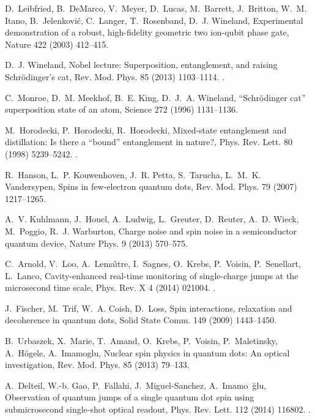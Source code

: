 \documentclass[3p,sort&compress]{elsarticle}
\begin{document}
\begin{thebibliography}{100}
D.~Leibfried, B.~DeMarco, V.~Meyer, D.~Lucas, M.~Barrett, J.~Britton, W.~M.
  Itano, B.~Jelenkovi{\'c}, C.~Langer, T.~Rosenband, D.~J. Wineland,
  Experimental demonstration of a robust, high-fidelity geometric two ion-qubit
  phase gate, Nature 422 (2003) 412--415.

D.~J. Wineland, Nobel lecture: Superposition, entanglement, and raising
  {S}chr{\"o}dinger's cat, Rev. Mod. Phys. 85 (2013) 1103--1114.
\newblock \href {http://dx.doi.org/10.1103/RevModPhys.85.1103}
  {}.

C.~Monroe, D.~M. Meekhof, B.~E. King, D.~J.~A. Wineland, {``}{S}chr{\"o}dinger
  cat{''} superposition state of an atom, Science 272 (1996) 1131--1136.

M.~Horodecki, P.~Horodecki, R.~Horodecki, Mixed-state entanglement and
  distillation: Is there a ``bound'' entanglement in nature?, Phys. Rev. Lett.
  80 (1998) 5239--5242.
\newblock \href {http://dx.doi.org/10.1103/PhysRevLett.80.5239}
  {}.

R.~Hanson, L.~P. Kouwenhoven, J.~R. Petta, S.~Tarucha, L.~M.~K. Vandersypen,
  Spins in few-electron quantum dots, Rev. Mod. Phys. 79 (2007) 1217--1265.

A.~V. Kuhlmann, J.~Houel, A.~Ludwig, L.~Greuter, D.~Reuter, A.~D. Wieck,
  M.~Poggio, R.~J. Warburton, Charge noise and spin noise in a semiconductor
  quantum device, Nature Phys. 9 (2013) 570--575.

C.~Arnold, V.~Loo, A.~Lema\^{\i}tre, I.~Sagnes, O.~Krebs, P.~Voisin,
  P.~Senellart, L.~Lanco, Cavity-enhanced real-time monitoring of single-charge
  jumps at the microsecond time scale, Phys. Rev. X 4 (2014) 021004.
\newblock \href {http://dx.doi.org/10.1103/PhysRevX.4.021004}
  {}.

J.~Fischer, M.~Trif, W.~A. Coish, D.~Loss, Spin interactions, relaxation and
  decoherence in quantum dots, Solid State Comm. 149 (2009) 1443--1450.

B.~Urbaszek, X.~Marie, T.~Amand, O.~Krebs, P.~Voisin, P.~Maletinsky,
  A.~H\"ogele, A.~Imamoglu, Nuclear spin physics in quantum dots: An optical
  investigation, Rev. Mod. Phys. 85 (2013) 79--133.

A.~Delteil, W.-b. Gao, P.~Fallahi, J.~Miguel-Sanchez,
  A.~Imamo\ifmmode~\else \u{g}\fi{}lu, Observation of quantum jumps of
  a single quantum dot spin using submicrosecond single-shot optical readout,
  Phys. Rev. Lett. 112 (2014) 116802.
\newblock \href {http://dx.doi.org/10.1103/PhysRevLett.112.116802}
  {}.


\end{thebibliography}
\end{document}
